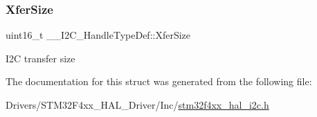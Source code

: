 \subsubsection{\texorpdfstring{Xfer\+Size}{XferSize}}
{\footnotesize\ttfamily uint16\+\_\+t \+\_\+\+\_\+\+I2\+C\+\_\+\+Handle\+Type\+Def\+::\+Xfer\+Size}

I2C transfer size 

The documentation for this struct was generated from the following file\+:\begin{DoxyCompactItemize}
\item 
Drivers/\+S\+T\+M32\+F4xx\+\_\+\+H\+A\+L\+\_\+\+Driver/\+Inc/\hyperlink{stm32f4xx__hal__i2c_8h}{stm32f4xx\+\_\+hal\+\_\+i2c.\+h}\end{DoxyCompactItemize}
